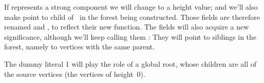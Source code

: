 If  represents a strong component we will change  to a
height value; and we'll also make  point to child
of~
in the forest being constructed.
Those fields are therefore renamed  and , to
reflect their new
function. The  fields will also acquire a new significance,
although
we'll keep calling them : They will point to siblings in the
forest,
namely to vertices with the same parent.

The dummy literal 1 will play the role of a global root, whose children
are all of the source vertices (the vertices of height~0).

